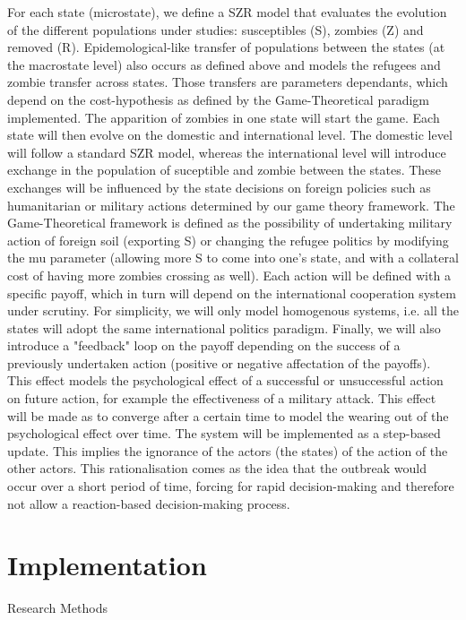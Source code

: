 \documentclass[11pt]{article}
\begin{document}
For each state (microstate), we define a SZR model that evaluates the evolution of the different populations under studies: susceptibles (S), zombies (Z) and removed (R). Epidemological-like transfer of populations between the states (at the macrostate level) also occurs as defined above and models the refugees and zombie transfer across states. Those transfers are parameters dependants, which depend on the cost-hypothesis as defined by the Game-Theoretical paradigm implemented. The apparition of zombies in one state will start the game. Each state will then evolve on the domestic and international level. The domestic level will follow a standard SZR model, whereas the international level will introduce exchange in the population of suceptible and zombie between the states. These exchanges will be influenced by the state decisions on foreign policies such as humanitarian or military actions determined by our game theory framework. The Game-Theoretical framework is defined as the possibility of undertaking military action of foreign soil (exporting S) or changing the refugee politics by modifying the mu parameter (allowing more S to come into one's state, and with a collateral cost of having more zombies crossing as well). Each action will be defined with a specific payoff, which in turn will depend on the international cooperation system under scrutiny. For simplicity, we will only model homogenous systems, i.e. all the states will adopt the same international politics paradigm. Finally, we will also introduce a "feedback" loop on the payoff depending on the success of a previously undertaken action (positive or negative affectation of the payoffs). This effect models the psychological effect of a successful or unsuccessful action on future action, for example the effectiveness of a military attack. This effect will be made as to converge after a certain time to model the wearing out of the psychological effect over time. The system will be implemented as a step-based update. This implies the ignorance of the actors (the states) of the action of the other actors. This rationalisation comes as the idea that the outbreak would occur over a short period of time, forcing for rapid decision-making and therefore not allow a reaction-based decision-making process. 

\section{Implementation}\indent
Research Methods
\end{document}
